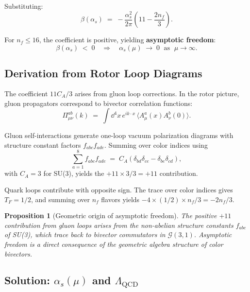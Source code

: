 \documentclass[11pt,a4paper]{article}
\newcommand{\Cl}{\mathcal{G}}
\theoremstyle{definition}
\theoremstyle{plain}
\newtheorem{proposition}{Proposition}[section]
\theoremstyle{remark}
\begin{document}
Substituting:
\begin{equation}
\beta(\alpha_s) \;=\; -\frac{\alpha_s^2}{2\pi}\left(11 - \frac{2n_f}{3}\right).
\label{eq:beta-qcd}
\end{equation}

For $n_f \le 16$, the coefficient is positive, yielding \textbf{asymptotic freedom}:
\begin{equation}
\beta(\alpha_s) \;<\; 0 \quad\Rightarrow\quad \alpha_s(\mu) \;\to\; 0 \;\text{ as }\; \mu \to \infty.
\end{equation}

\subsection{Derivation from Rotor Loop Diagrams}

The coefficient $11C_A/3$ arises from gluon loop corrections. In the rotor picture, gluon propagators correspond to bivector correlation functions:
\begin{equation}
\Pi_{\mu\nu}^{ab}(k) \;=\; \int \dd^4x \, e^{ik \cdot x}\,\langle A_\mu^a(x) A_\nu^b(0) \rangle.
\end{equation}

Gluon self-interactions generate one-loop vacuum polarization diagrams with structure constant factors $f_{abc}f_{ade}$. Summing over color indices using
\begin{equation}
\sum_{a=1}^8 f_{abc}f_{ade} \;=\; C_A(\delta_{bd}\delta_{ce} - \delta_{be}\delta_{cd}),
\end{equation}
with $C_A = 3$ for SU(3), yields the $+11 \times 3/3 = +11$ contribution.

Quark loops contribute with opposite sign. The trace over color indices gives $T_F = 1/2$, and summing over $n_f$ flavors yields $-4 \times (1/2) \times n_f / 3 = -2n_f/3$.

\begin{proposition}[Geometric origin of asymptotic freedom]
The positive $+11$ contribution from gluon loops arises from the non-abelian structure constants $f_{abc}$ of SU(3), which trace back to bivector commutators in $\Cl(3,1)$. Asymptotic freedom is a direct consequence of the geometric algebra structure of color bivectors.
\end{proposition}

\subsection{Solution: $\alpha_s(\mu)$ and $\Lambda_{\mathrm{QCD}}$}
\end{document}

